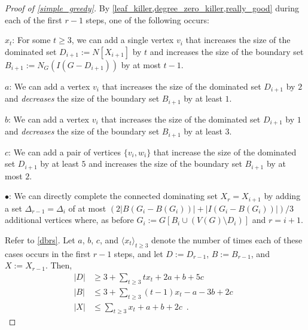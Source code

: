 \documentclass[a4paper,UKenglish,cleveref, autoref, thm-restate]{lipics-v2021}
\begin{document}
\begin{proof}[Proof of \cref{simple_greedy}]
  By \cref{leaf_killer,degree_zero_killer,really_good} during each of the first $r-1$ steps, one of the following occurs:
  \begin{compactitem}
    \item[$x_t$:] For some $t\ge 3$, we can add a single vertex $v_i$ that increases the size of the dominated set $D_{i+1}:=N[X_{i+1}]$ by $t$ and increases the size of the boundary set $B_{i+1}:=N_G(I(G-D_{i+1}))$ by at most $t-1$.
    \item[$a$:] We can add a vertex $v_i$ that increases the size of the dominated set $D_{i+1}$ by $2$ and \emph{decreases} the size of the boundary set $B_{i+1}$ by at least $1$.
    \item[$b$:] We can add a vertex $v_i$ that increases the size of the dominated set $D_{i+1}$ by $1$ and \emph{decreases} the size of the boundary set $B_{i+1}$ by at least $3$.
    \item[$c$:] We can add a pair of vertices $\{v_i,w_i\}$ that increase the size of the dominated set $D_{i+1}$ by at least $5$ and increases the size of the boundary set $B_{i+1}$ by at most $2$.
    \item[$\bullet$:] We can directly complete the connected dominating set $X_r=X_{i+1}$ by adding a set $\Delta_{r-1}=\Delta_i$ of at most $(2|B(G_{i}-B(G_i))|+|I(G_i-B(G_i))|)/3$ additional vertices where, as before $G_i:=G[B_i\cup (V(G)\setminus D_i)]$ and $r=i+1$.
  \end{compactitem}

  Refer to \cref{dbrs}. Let $a$, $b$, $c$, and $\langle x_t\rangle_{t\ge 3}$ denote the number of times each of these cases occurs in the first $r-1$ steps, and let $D:=D_{r-1}$, $B:=B_{r-1}$, and $X:=X_{r-1}$.  Then,
  \begin{align}
    |D| & \ge 3 + \sum_{t\ge 3}tx_t + 2a + b + 5c \label{dd_size} \\
    |B| & \le 3 + \sum_{t\ge 3}(t-1)x_t - a - 3b + 2c \enspace \label{bb_size} \\
    |X| & \le \sum_{t\ge 3}x_t + a + b + 2c \label{x_size} \enspace .
  \end{align}


\end{proof}
\end{document}
